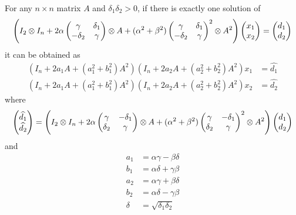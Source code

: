\documentclass[11pt,a4paper]{article}
\begin{document}
\begin{lemma}
\label{sylv:second-lemma}
For any $n\times n$ matrix $A$ and $\delta_1\delta_2>0$, if there is
exactly one solution of
$$\left(I_2\otimes I_n +
2\alpha\begin{pmatrix}\gamma&\delta_1\cr-\delta_2&\gamma\end{pmatrix}\otimes A
+(\alpha^2+\beta^2)
\begin{pmatrix}\gamma&\delta_1\cr-\delta_2&\gamma\end{pmatrix}^2\otimes A^2\right)
\begin{pmatrix} x_1\cr x_2\end{pmatrix}=
\begin{pmatrix} d_1\cr d_2\end{pmatrix}
$$
it can be obtained as
\begin{align*}
\left(I_n+2a_1A+(a_1^2+b_1^2)A^2\right)\left(I_n+2a_2A+(a_2^2+b_2^2)A^2\right)
x_1 & =\widehat{d_1}\\
\left(I_n+2a_1A+(a_1^2+b_1^2)A^2\right)\left(I_n+2a_2A+(a_2^2+b_2^2)A^2\right)
x_2 & =\widehat{d_2}
\end{align*}
where
$$
\begin{pmatrix} \widehat{d_1}\cr\widehat{d_2}\end{pmatrix} =
\left(I_2\otimes I_n +
2\alpha\begin{pmatrix}\gamma&-\delta_1\cr\delta_2&\gamma\end{pmatrix}\otimes A
+(\alpha^2+\beta^2)
\begin{pmatrix}\gamma&-\delta_1\cr\delta_2&\gamma\end{pmatrix}^2\otimes A^2\right)
\begin{pmatrix} d_1\cr d_2\end{pmatrix}
$$
and
\begin{align*}
a_1 & = \alpha\gamma - \beta\delta\\
b_1 & = \alpha\delta + \gamma\beta\\
a_2 & = \alpha\gamma + \beta\delta\\
b_2 & = \alpha\delta - \gamma\beta\\
\delta & = \sqrt{\delta_1\delta_2}
\end{align*}

\end{lemma}
\end{document}
